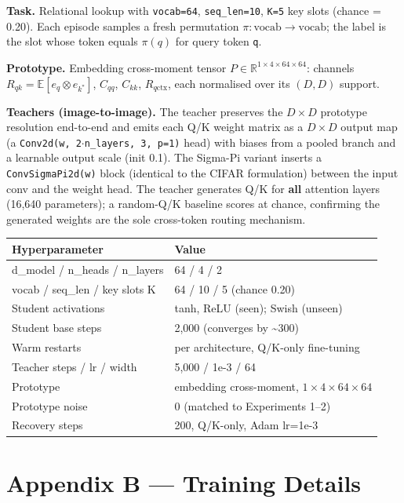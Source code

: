 \documentclass{article}
\begin{document}
\textbf{Task.} Relational lookup with \texttt{vocab=64}, \texttt{seq\_len=10}, \texttt{K=5} key slots (chance = 0.20). Each episode samples a fresh permutation $\pi:\mathrm{vocab}\to\mathrm{vocab}$; the label is the slot whose token equals $\pi(q)$ for query token \texttt{q}.

\textbf{Prototype.} Embedding cross-moment tensor $P \in \mathbb{R}^{1\times4\times64\times64}$: channels $R_{qk}=\mathbb{E}[e_q\otimes e_{k^\ast}]$, $C_{qq}$, $C_{kk}$, $R_{q\mathrm{ctx}}$, each normalised over its $(D,D)$ support.

\textbf{Teachers (image-to-image).} The teacher preserves the $D\times D$ prototype resolution end-to-end and emits each Q/K weight matrix as a $D\times D$ output map (a \texttt{Conv2d(w,\ 2$\cdot$n\_layers,\ 3,\ p=1)} head) with biases from a pooled branch and a learnable output scale (init 0.1). The Sigma-Pi variant inserts a \texttt{ConvSigmaPi2d(w)} block (identical to the CIFAR formulation) between the input conv and the weight head. The teacher generates Q/K for \textbf{all} attention layers (16,640 parameters); a random-Q/K baseline scores at chance, confirming the generated weights are the sole cross-token routing mechanism.

\begin{longtable}[]{@{}ll@{}}
\toprule\noalign{}
Hyperparameter & Value \\
\midrule\noalign{}
\endhead
\bottomrule\noalign{}
\endlastfoot
d\_model / n\_heads / n\_layers & 64 / 4 / 2 \\
vocab / seq\_len / key slots K & 64 / 10 / 5 (chance 0.20) \\
Student activations & tanh, ReLU (seen); Swish (unseen) \\
Student base steps & 2,000 (converges by \textasciitilde300) \\
Warm restarts & per architecture, Q/K-only fine-tuning \\
Teacher steps / lr / width & 5,000 / 1e-3 / 64 \\
Prototype & embedding cross-moment, $1\times4\times64\times64$ \\
Prototype noise & 0 (matched to Experiments 1--2) \\
Recovery steps & 200, Q/K-only, Adam lr=1e-3 \\
\end{longtable}

\section{Appendix B --- Training Details}\label{appendix-b-training-details}
\end{document}

